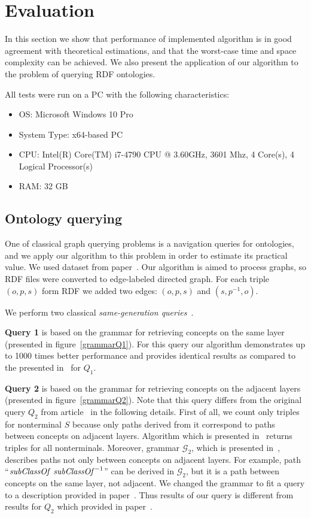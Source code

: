 \section{Evaluation}

In this section we show that performance of implemented algorithm is in good agreement with theoretical estimations, and that the worst-case time and space complexity can be achieved.
We also present the application of our algorithm to the problem of querying RDF ontologies.

All tests were run on a PC with the following characteristics:
\begin{itemize}
\item OS: Microsoft Windows 10 Pro
\item System Type: x64-based PC
\item CPU: Intel(R) Core(TM) i7-4790 CPU @ 3.60GHz, 3601 Mhz, 4 Core(s), 4 Logical Processor(s)
\item RAM: 32 GB
\end{itemize}


\subsection{Ontology querying}

One of classical graph querying problems is a navigation queries for ontologies, and we apply our algorithm to this problem in order to estimate its practical value.
We used dataset from paper~\cite{CFGonRDF}.
Our algorithm is aimed to process graphs, so RDF files were converted to edge-labeled directed graph.
For each triple $(o,p,s)$ form RDF we added two edges: $(o,p,s)$ and $(s,p^{-1},o)$.

We perform two classical \textit{same-generation queries}~\cite{FndDB}.

\textbf{Query 1} is based on the grammar for retrieving concepts on the same layer (presented in figure~\ref{grammarQ1}).
For this query our algorithm demonstrates up to 1000 times better performance and provides identical results as compared to the presented in~\cite{CFGonRDF} for $Q_1$. 

\textbf{Query 2} is based on the grammar for retrieving concepts on the adjacent layers (presented in figure~\ref{grammarQ2}). 
Note that this query differs from the original query $Q_2$ from article~\cite{CFGonRDF} in the following details.
First of all, we count only triples for nonterminal $S$ because only paths derived from it correspond to paths between concepts on adjacent layers.
Algorithm which is presented in~\cite{CFGonRDF} returns triples for all nonterminals.
Moreover, grammar $\mathcal{G}_2$, which is presented in~\cite{CFGonRDF}, describes paths not only between concepts on adjacent layers.
For example, path ``$\text{\textit{subClassOf} \textit{subClassOf}}^{-1}$'' can be derived in $\mathcal{G}_2$, but it is a path between concepts on the same layer, not adjacent.
We changed the grammar to fit a query to a description provided in paper~\cite{CFGonRDF}. 
Thus results of our query is different from results for $Q_2$ which provided in paper~\cite{CFGonRDF}.

